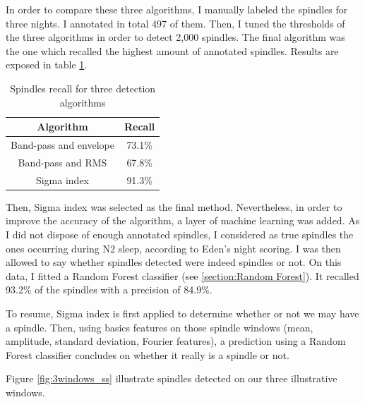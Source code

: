 \documentclass[12pt]{report}
\begin{document}
In order to compare these three algorithms, I manually labeled the spindles for three nights. I annotated in total 497 of them. Then, I tuned the thresholds of the three algorithms in order to detect 2,000 spindles. The final algorithm was the one which recalled the highest amount of annotated spindles. Results are exposed in table \ref{tab:ss_recall}.

\begin{table}[H]
\centering
\begin{tabular}{c|c}
Algorithm & Recall \\\hline
Band-pass and envelope & 73.1\% \\
Band-pass and RMS & 67.8\% \\
Sigma index & 91.3\% \\
\end{tabular}
\caption{\label{tab:ss_recall}Spindles recall for three detection algorithms}
\end{table}

Then, Sigma index was selected as the final method. Nevertheless, in order to improve the accuracy of the algorithm, a layer of machine learning was added. As I did not dispose of enough annotated spindles, I considered as true spindles the ones occurring during N2 sleep, according to Eden's night scoring. I was then allowed to say whether spindles detected were indeed spindles or not. On this data, I fitted a Random Forest classifier (see \ref{section:Random Forest}). It recalled 93.2\% of the spindles with a precision of 84.9\%.

To resume, Sigma index is first applied to determine whether or not we may have a spindle. Then, using basics features on those spindle windows (mean, amplitude, standard deviation, Fourier features), a prediction using a Random Forest classifier concludes on whether it really is a spindle or not.

Figure \ref{fig:3windows_ss} illustrate spindles detected on our three illustrative windows.
\end{document}
